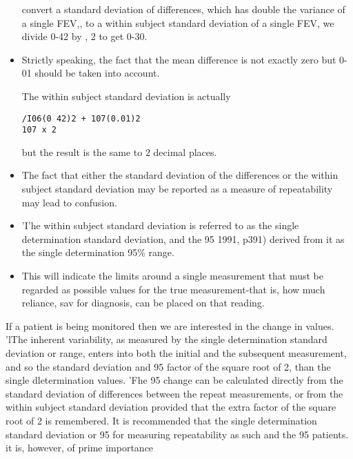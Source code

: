 \documentclass{article}
\begin{document}
\begin{itemize}
convert a standard deviation of differences,
which has double the variance of a single
FEV,, to a within subject standard deviation
of a single FEV, we divide 0-42 by ,
2 to get
0-30. \item Strictly speaking, the fact that the mean
difference is not exactly zero but 0-01 should
be taken into account. 

The within subject
standard deviation is actually

\begin{verbatim}
/I06(0 42)2 + 107(0.01)2
107 x 2
\end{verbatim}
but the result is the same to 2 decimal places.
\item The fact that either the standard deviation
of the differences or the within subject standard
deviation may be reported as a measure of repeatability may lead to confusion.
\item  'I'he
within subject standard deviation is referred
to as the single determination standard deviation,
and the 95%
1991, p391) derived from it as the single
determination 95\% range. \item This will indicate
the limits around a single measurement that
must be regarded as possible values for the
true measurement-that is, how much
reliance, sav for diagnosis, can be placed on
that reading.
\end{itemize}
If a patient is being monitored then we are
interested in the change in values. 'lThe
inherent variability, as measured by the single
determination standard deviation or range,
enters into both the initial and the subsequent
measurement, and so the standard deviation
and 95%
factor of the square root of 2, than the single
dletermination values. 'Fhe 95%
change can be calculated directly from the
standard deviation of differences between the
repeat measurements, or from the within
subject standard deviation provided that the
extra factor of the square root of 2 is
remembered.
It is recommended that the single determination
standard deviation or 95%
for measuring repeatability as such and the
95%
patients. it is, however, of prime importance
\end{document}
